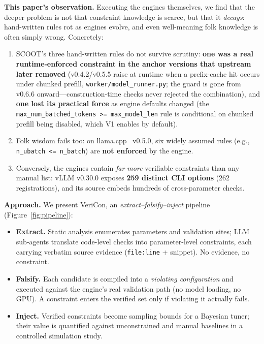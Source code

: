 \documentclass[journal]{IEEEtran}
\newcommand{\code}[1]{\texttt{#1}}
\begin{document}
\textbf{This paper's observation.} Executing the engines themselves, we find that the deeper problem is not that constraint knowledge is scarce, but that it \emph{decays}: hand-written rules rot as engines evolve, and even well-meaning folk knowledge is often simply wrong. Concretely:
\begin{enumerate}
  \item SCOOT's three hand-written rules do not survive scrutiny: \textbf{one was a real runtime-enforced constraint in the anchor versions that upstream later removed} (v0.4.2/v0.5.5 raise at runtime when a prefix-cache hit occurs under chunked prefill, \code{worker/model\_runner.py}; the guard is gone from v0.6.6 onward---construction-time checks never rejected the combination), and \textbf{one lost its practical force} as engine defaults changed (the \code{max\_num\_batched\_tokens >= max\_model\_len} rule is conditional on chunked prefill being disabled, which V1 enables by default).
  \item Folk wisdom fails too: on llama.cpp~\cite{ref18} v0.5.0, six widely assumed rules (e.g., \code{n\_ubatch <= n\_batch}) are \textbf{not enforced} by the engine.
  \item Conversely, the engines contain \emph{far more} verifiable constraints than any manual list: vLLM v0.30.0 exposes \textbf{259 distinct CLI options} (262 registrations), and its source embeds hundreds of cross-parameter checks.
\end{enumerate}

\textbf{Approach.} We present VeriCon, an \emph{extract--falsify--inject} pipeline (Figure~\ref{fig:pipeline}):
\begin{itemize}
  \item \textbf{Extract.} Static analysis enumerates parameters and validation sites; LLM sub-agents translate code-level checks into parameter-level constraints, each carrying verbatim source evidence (\code{file:line} + snippet). No evidence, no constraint.
  \item \textbf{Falsify.} Each candidate is compiled into a \emph{violating configuration} and executed against the engine's real validation path (no model loading, no GPU). A constraint enters the verified set only if violating it actually fails.
  \item \textbf{Inject.} Verified constraints become sampling bounds for a Bayesian tuner; their value is quantified against unconstrained and manual baselines in a controlled simulation study.
\end{itemize}
\end{document}
